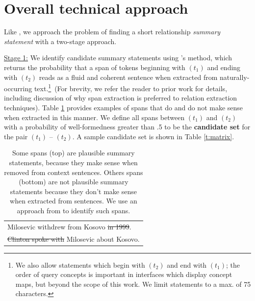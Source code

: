 \documentclass[11pt,a4paper]{article}
\begin{document}
\section{Overall technical approach}\label{s:approach}

Like \citet{N18-1159}, we approach the problem of finding a short relationship \textit{summary statement} with a two-stage approach. 

\underline{Stage 1:} We identify candidate summary statements using \citet{N18-1159}'s method, which returns the probability that a span of tokens beginning with $(t_1)$ and ending with $(t_2)$ reads as a fluid and coherent sentence when extracted from naturally-occurring text.\footnote{We also allow statements which begin with $(t_2)$ and end with $(t_1)$; the order of query concepts is important in interfaces which display concept maps, but beyond the scope of this work. We limit statements to a max. of 75 characters.}\ (For brevity, we refer the reader to prior work for details, including discussion of why span extraction is preferred to relation extraction techniques). Table \ref{t:spans} provides examples of spans that do and do not make sense when extracted in this manner. We define all spans between $(t_1)$ and $(t_2)$ with a probability of well-formedness greater than .5 to be the \textbf{candidate set} for the pair $(t_1)$ -- $(t_2)$. A sample candidate set is shown in Table \ref{t:matrix}. 

 \begin{table}[htbp!]
\begin{tabular}{p{7.1cm}}  \toprule %
Milosevic withdrew from Kosovo \sout{in 1999}.\\ 
\sout{Clinton spoke with} Milosevic about Kosovo.\\ \toprule
\end{tabular}
\caption{Some spans (top) are plausible summary statements, because they make sense when removed from context sentences. Others spans (bottom) are not plausible summary statements because they don't make sense when extracted from sentences. We use an approach from \citet{N18-1159} to identify such spans.}
\label{t:spans}
\end{table}
\end{document}
